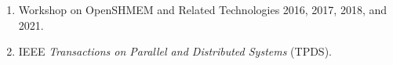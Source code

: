 \begin{enumerate}
\setcounter{enumi}{0}
\item Workshop on OpenSHMEM and Related Technologies 2016, 2017, 2018, and 2021.
\item IEEE \textit{Transactions on Parallel and Distributed Systems} (TPDS).
\end{enumerate}

